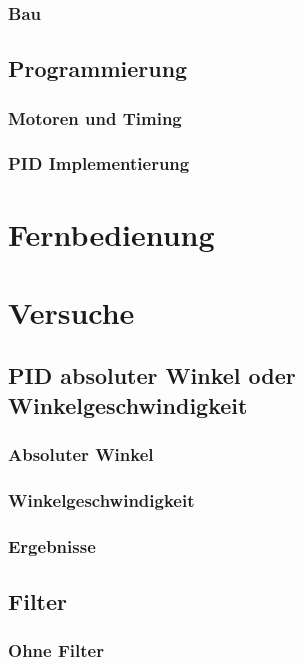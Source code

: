 \documentclass[12pt,a4paper, ngerman]{article}
\begin{document}
\subsubsection{Bau}

\subsection{Programmierung}

\subsubsection{Motoren und Timing}

\subsubsection{PID Implementierung}

\section{Fernbedienung}

\section{Versuche}

\subsection{PID absoluter Winkel oder Winkelgeschwindigkeit}

\subsubsection{Absoluter Winkel}

\subsubsection{Winkelgeschwindigkeit}

\subsubsection{Ergebnisse}

\subsection{Filter}

\subsubsection{Ohne Filter}
\end{document}
